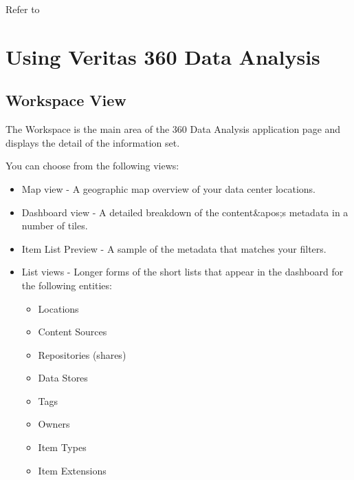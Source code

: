 \documentclass[letterpaper,10pt,english]{sphinxmanual}
\begin{document}
Refer to 


\section{Using Veritas 360 Data Analysis}
\label{\detokenize{mcdmp_app_ug:using-visibility}}\label{\detokenize{mcdmp_app_ug:using-veritas-360-data-analysis}}

\subsection{Workspace View}
\label{\detokenize{mcdmp_app_ug:workspace-view}}
The Workspace is the main area of the 360 Data Analysis application page and displays the detail of the information set.

You can choose from the following views:
\begin{itemize}
\item {} 
Map view -   A geographic map overview of your data center locations.

\item {} 
Dashboard view - A detailed breakdown of the content\&apos;s metadata in a number of tiles.

\item {} 
Item List Preview - A sample of the metadata that matches your filters.

\item {} 
List views - Longer forms of the short lists that appear in the dashboard for the following entities:
\begin{itemize}
\item {} 
Locations

\item {} 
Content Sources

\item {} 
Repositories (shares)

\item {} 
Data Stores

\item {} 
Tags

\item {} 
Owners

\item {} 
Item Types

\item {} 
Item Extensions

\end{itemize}

\end{itemize}
\end{document}
